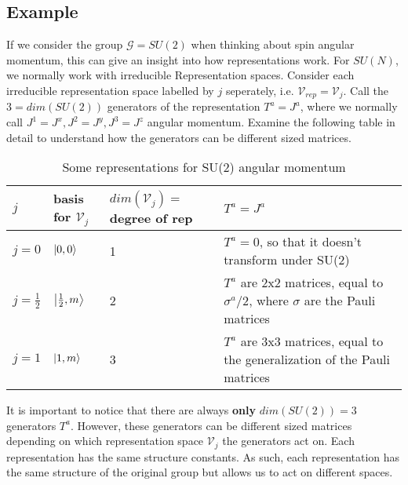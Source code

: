 \subsection{Example}
If we consider the group $\mathcal{G}=SU(2)$ when thinking about spin angular
momentum, this can give an insight into how representations work. For $SU(N)$,
we normally work with irreducible Representation spaces. Consider each
irreducible
representation space labelled by $j$ seperately, i.e.
$\mathcal{V}_{rep}=\mathcal{V}_j$. Call the $3=dim(SU(2))$ generators of
the representation $T^a=J^a$, where we normally call $J^1=J^x, J^2=J^y,
J^3=J^z$ angular momentum. Examine the following table in detail to understand
how the generators can be different sized matrices.
\\
\begin{table}[h!]
  \begin{tabular}{|p{1cm}|p{2cm}|p{4cm}|p{5cm}|}
    \hline
    $j$ & basis for $\mathcal{V}_j$ & $dim(\mathcal{V}_j)=$ degree of rep
        & $T^a = J^a$  \\ 
    \hline
    $j=0$ & $\ket{0,0}$ & 1 & $T^a=0$, so that it doesn't transform under SU(2)   \\ 
    \hline
    $j=\frac{1}{2}$ & $\ket{\frac{1}{2},m}$ & 2 & $T^a$ are 2x2 matrices, equal
    to $\sigma^a/2$, where $\sigma$ are the Pauli matrices  \\ 
    \hline
    $j=1$ & $\ket{1,m}$ & 3 & $T^a$ are 3x3 matrices, equal to the
    generalization of the Pauli matrices  \\ 
    \hline
  \end{tabular}
  \caption{Some representations for SU(2) angular momentum}\label{tab1}
\end{table}
It is important to notice that there are always \textbf{only} $dim(SU(2))=3$
generators $T^a$. However, these generators can be different sized matrices
depending on which representation space $\mathcal{V}_j$ the generators
act on. Each representation has the same structure constants. As such, each
representation has the same structure of the original group but allows
us to act on different spaces.
